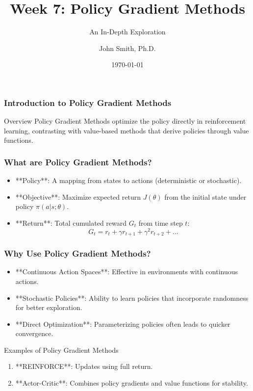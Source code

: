 \documentclass[aspectratio=169]{beamer}
\title[Week 7: Policy Gradient Methods]{Week 7: Policy Gradient Methods}
\subtitle{An In-Depth Exploration}
\author[J. Smith]{John Smith, Ph.D.}
\institute[University Name]{
  Department of Computer Science\\
  University Name\\
  \vspace{0.3cm}
  Email: email@university.edu\\
  Website: www.university.edu
}
\date{\today}
\begin{document}
\frame{\titlepage}

\begin{frame}[fragile]
    \frametitle{Introduction to Policy Gradient Methods}
    \begin{block}{Overview}
        Policy Gradient Methods optimize the policy directly in reinforcement learning, contrasting with value-based methods that derive policies through value functions.
    \end{block}
\end{frame}

\begin{frame}[fragile]
    \frametitle{What are Policy Gradient Methods?}
    \begin{itemize}
        \item **Policy**: A mapping from states to actions (deterministic or stochastic).
        \item **Objective**: Maximize expected return \( J(\theta) \) from the initial state under policy \( \pi(a|s; \theta) \).
        \item **Return**: Total cumulated reward \( G_t \) from time step \( t \):
        \begin{equation}
            G_t = r_t + \gamma r_{t+1} + \gamma^2 r_{t+2} + \ldots
        \end{equation}
    \end{itemize}
\end{frame}

\begin{frame}[fragile]
    \frametitle{Why Use Policy Gradient Methods?}
    \begin{itemize}
        \item **Continuous Action Spaces**: Effective in environments with continuous actions.
        \item **Stochastic Policies**: Ability to learn policies that incorporate randomness for better exploration.
        \item **Direct Optimization**: Parameterizing policies often leads to quicker convergence.
    \end{itemize}
    
    \begin{block}{Examples of Policy Gradient Methods}
        \begin{enumerate}
            \item **REINFORCE**: Updates using full return.
            \item **Actor-Critic**: Combines policy gradients and value functions for stability.
        \end{enumerate}
    \end{block}
\end{frame}
\end{document}

